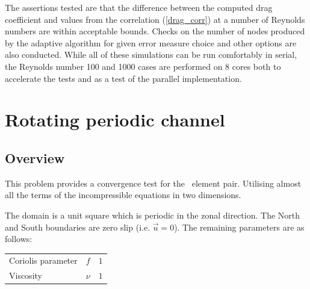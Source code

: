 The assertions tested are that the difference between
the computed drag coefficient and values from the correlation 
(\ref{drag_corr}) at a number of Reynolds numbers are within acceptable bounds.
Checks on the number of nodes produced by the adaptive algorithm for 
given error measure choice and other options are also conducted. While
all of these simulations can be run comfortably in serial, the Reynolds 
number 100 and 1000 cases are performed on 8 cores both to accelerate the 
tests and as a test of the parallel implementation.







\section{Rotating periodic channel}
\label{sect:periodic_channel}

\subsection{Overview}

This problem provides a convergence test for the \PoDGPt\ element pair.
Utilising almost all the terms of the incompressible equations in two
dimensions.

The domain is a unit square which is periodic in the zonal direction. The
North and South boundaries are zero slip (i.e. $\vec{u}=0$). The remaining
parameters are as follows:

\begin{tabular}{lll}
  Coriolis parameter & $f$ & $1$ \\
  Viscosity & $\nu$ & $1$ 
\end{tabular}

